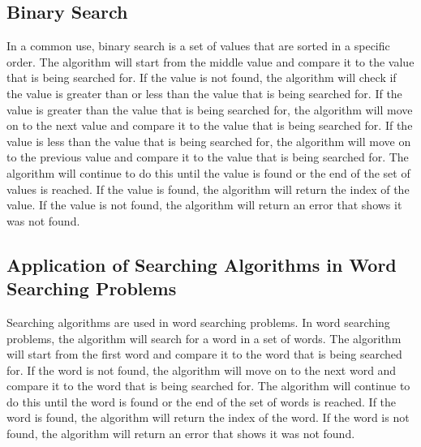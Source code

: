 \documentclass[12pt]{article}
\begin{document}
    \subsection*{Binary Search}
    \par In a common use, binary search is a set of values that are sorted in a specific order. The algorithm will start from the middle value and compare it to the value that is being searched for. If the value is not found, the algorithm will check if the value is greater than or less than the value that is being searched for. If the value is greater than the value that is being searched for, the algorithm will move on to the next value and compare it to the value that is being searched for. If the value is less than the value that is being searched for, the algorithm will move on to the previous value and compare it to the value that is being searched for. The algorithm will continue to do this until the value is found or the end of the set of values is reached. If the value is found, the algorithm will return the index of the value. If the value is not found, the algorithm will return an error that shows it was not found.\cite*{binary_search}
    \subsection*{Application of Searching Algorithms in Word Searching Problems}
    \par Searching algorithms are used in word searching problems. In word searching problems, the algorithm will search for a word in a set of words. The algorithm will start from the first word and compare it to the word that is being searched for. If the word is not found, the algorithm will move on to the next word and compare it to the word that is being searched for. The algorithm will continue to do this until the word is found or the end of the set of words is reached. If the word is found, the algorithm will return the index of the word. If the word is not found, the algorithm will return an error that shows it was not found.\cite*{word_searching}
    \medskip 
    \printbibliography[title={References}]
\end{document}
